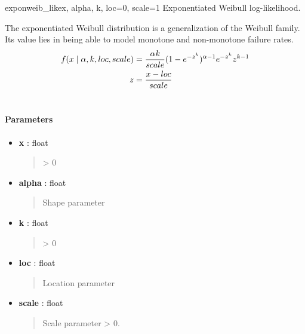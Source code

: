\hypertarget{pymc.distributions.exponweib_like}{}\begin{funcdesc}{exponweib\_like}{x, alpha, k, loc=0, scale=1}
Exponentiated Weibull log-likelihood.

The exponentiated Weibull distribution is a generalization of the Weibull
family. Its value lies in being able to model monotone and non-monotone
failure rates.
\begin{gather}
\begin{split}f(x \mid \alpha,k,loc,scale)  & = \frac{\alpha k}{scale} (1-e^{-z^k})^{\alpha-1} e^{-z^k} z^{k-1} \\
z & = \frac{x-loc}{scale}\end{split}\notag\\\begin{split}\end{split}\notag
\end{gather}\paragraph{Parameters}
\begin{itemize}
\item[] \textbf{x} : float
\begin{quote}

\textgreater{} 0
\end{quote}

\item[] \textbf{alpha} : float
\begin{quote}

Shape parameter
\end{quote}

\item[] \textbf{k} : float
\begin{quote}

\textgreater{} 0
\end{quote}

\item[] \textbf{loc} : float
\begin{quote}

Location parameter
\end{quote}

\item[] \textbf{scale} : float
\begin{quote}

Scale parameter \textgreater{} 0.
\end{quote}
\end{itemize}
\end{funcdesc}


